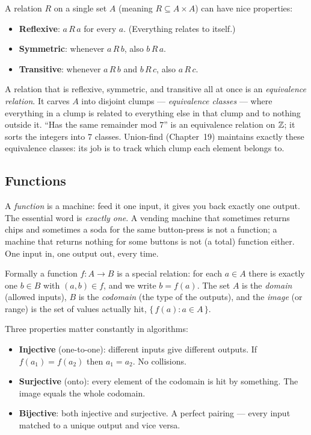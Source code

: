 A relation $R$ on a single set $A$ (meaning $R \subseteq A \times A$) can have nice
properties:
\begin{itemize}
\item \textbf{Reflexive}: $a\, R\, a$ for every $a$. (Everything relates to itself.)
\item \textbf{Symmetric}: whenever $a\, R\, b$, also $b\, R\, a$.
\item \textbf{Transitive}: whenever $a\, R\, b$ and $b\, R\, c$, also $a\, R\, c$.
\end{itemize}
A relation that is reflexive, symmetric, and transitive all at once is an
\emph{equivalence relation}. It carves $A$ into disjoint clumps --- \emph{equivalence
classes} --- where everything in a clump is related to everything else in that clump
and to nothing outside it. ``Has the same remainder mod $7$'' is an equivalence
relation on $\mathbb{Z}$; it sorts the integers into $7$ classes. Union-find
(Chapter~19) maintains exactly these equivalence classes: its job
is to track which clump each element belongs to.

\subsection{Functions}

\begin{intuitionbox}
A \emph{function} is a machine: feed it one input, it gives you back exactly one
output. The essential word is \emph{exactly one}. A vending machine that sometimes
returns chips and sometimes a soda for the same button-press is not a function; a
machine that returns nothing for some buttons is not (a total) function either. One
input in, one output out, every time.
\end{intuitionbox}

Formally a function $f : A \to B$ is a special relation: for each $a \in A$ there is
exactly one $b \in B$ with $(a, b) \in f$, and we write $b = f(a)$. The set $A$ is the
\emph{domain} (allowed inputs), $B$ is the \emph{codomain} (the type of the outputs),
and the \emph{image} (or range) is the set of values actually hit,
$\{\, f(a) : a \in A \,\}$.

Three properties matter constantly in algorithms:
\begin{itemize}
\item \textbf{Injective} (one-to-one): different inputs give different outputs. If
$f(a_1) = f(a_2)$ then $a_1 = a_2$. No collisions.
\item \textbf{Surjective} (onto): every element of the codomain is hit by something.
The image equals the whole codomain.
\item \textbf{Bijective}: both injective and surjective. A perfect pairing --- every
input matched to a unique output and vice versa.
\end{itemize}

